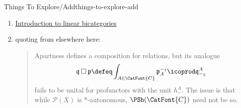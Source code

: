 \begin{remark}{Things To Explore/Add}{things-to-explore-add}
\begin{enumerate}
\begin{enumerate}
                \item \href{https://www.math.mcgill.ca/rags/bicats/bicat.pdf}{Introduction to linear bicategories}
                \item quoting from elsewhere here:
                    \begin{quote}
                        Apartness defines a composition for relations, but its analogue
                        \[
                            \mathfrak{q}\mathbin{\square}\mathfrak{p}%
                            \defeq%
                            \int_{A\in\CatFont{C}}\mathfrak{p}^{-_{1}}_{A}\icoprod\mathfrak{q}^{A}_{-_{2}}%
                        \]%
                        fails to be unital for profunctors with the unit $h^{A}_{-}$. The issue is that while $\mathcal{P}(X)$ is *-autonomous, $\PSh(\CatFont{C})$ need not be so.


\end{quote}
\end{enumerate}
\end{enumerate}
\end{remark}
